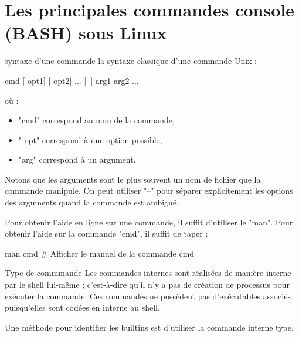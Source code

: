 \documentclass[10pt]{beamer}
\begin{document}
\section{Les principales commandes console (BASH) sous Linux}

\begin{frame}[fragile]{syntaxe d'une commande}
la syntaxe classique d'une commande Unix :

\begin{center}
cmd [-opt1] [-opt2] ... [--] arg1 arg2 ...
\end{center}

où :

\begin{itemize}
\item  "cmd" correspond au nom de la commande,
\item  "-opt" correspond à une option possible,
\item  "arg" correspond à un argument.
\end{itemize}
\pause

Notons que les arguments sont le plus souvent un nom de fichier que la commande manipule. On peut utiliser "--" pour séparer explicitement les options des arguments quand la commande est ambiguë.

Pour obtenir l'aide en ligne sur une commande, il suffit d'utiliser le "man". Pour obtenir l'aide sur la commande "cmd", il suffit de taper :
\begin{mylisting}
man cmd # Afficher le manuel de la commande cmd
\end{mylisting}
\end{frame}

\begin{frame}[fragile]{Type de commmande}
Les commandes internes sont réalisées de manière interne par le shell lui-même ; c’est-à-dire qu’il n’y a pas de création de processus
pour exécuter la commande. Ces commandes ne possèdent pas d’exécutables associés puisqu’elles sont codées en interne au shell.

Une méthode pour identifier les builtins est d’utiliser la commande interne type.

\end{frame}
\end{document}
